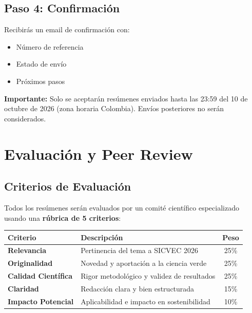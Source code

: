 \documentclass[12pt,a4paper]{article}
\begin{document}
\subsection{Paso 4: Confirmación}

Recibirás un email de confirmación con:
\begin{itemize}[label={\textcolor{verdemid}{\checkmark}}]
  \item Número de referencia
  \item Estado de envío
  \item Próximos pasos
\end{itemize}

\begin{tcolorbox}[cajaalerta]
\textbf{Importante:} Solo se aceptarán resúmenes enviados hasta las 23:59 del 10 de octubre de 2026 (zona horaria Colombia). Envíos posteriores no serán considerados.
\end{tcolorbox}

\section{Evaluación y Peer Review}

\subsection{Criterios de Evaluación}

Todos los resúmenes serán evaluados por un comité científico especializado usando una \textbf{rúbrica de 5 criterios}:

\begin{table}[H]
\centering
\small
\begin{tabular}{|l|p{8cm}|c|}
\hline
\rowcolor{verdeclaro}
\textbf{Criterio} & \textbf{Descripción} & \textbf{Peso} \\
\hline
\textbf{Relevancia} & Pertinencia del tema a SICVEC 2026 & 25\% \\
\hline
\textbf{Originalidad} & Novedad y aportación a la ciencia verde & 25\% \\
\hline
\textbf{Calidad Científica} & Rigor metodológico y validez de resultados & 25\% \\
\hline
\textbf{Claridad} & Redacción clara y bien estructurada & 15\% \\
\hline
\textbf{Impacto Potencial} & Aplicabilidad e impacto en sostenibilidad & 10\% \\
\hline
\end{tabular}
\end{table}
\end{document}
